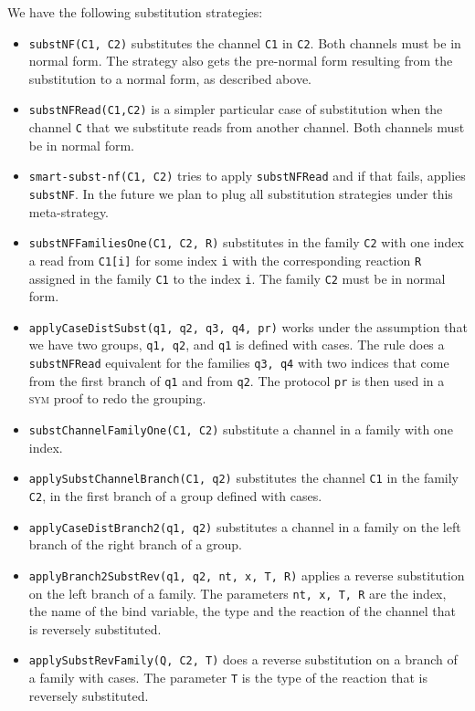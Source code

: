 We have the following substitution strategies:
\begin{itemize}
 \item  \texttt{substNF(C1, C2)} substitutes the channel \texttt{C1} in \texttt{C2}. Both channels must be in normal form. The strategy also gets the pre-normal form resulting from the substitution to a normal form, as described above.
   \item  \texttt{substNFRead(C1,C2)} is a simpler particular case of substitution when the channel \texttt{C} that we substitute reads from another channel. Both channels must be in normal form.
   \item  \texttt{smart-subst-nf(C1, C2)} tries to apply \texttt{substNFRead} and if that fails, applies \texttt{substNF}. 
In the future we plan to plug all substitution strategies under this
meta-strategy.
   \item  \texttt{substNFFamiliesOne(C1, C2, R)} substitutes in the family \texttt{C2} with one index a read from \texttt{C1[i]} for some index \texttt{i} with the corresponding reaction \texttt{R} assigned in the family \texttt{C1} to the index \texttt{i}. The family \texttt{C2} must be in normal form.
   \item  \texttt{applyCaseDistSubst(q1, q2, q3, q4, pr)} works under the assumption that we have two groups, \texttt{q1, q2}, and \texttt{q1} is defined with cases. The rule does a \texttt{substNFRead} equivalent for the families \texttt{q3, q4} with two indices that come from the first branch of \texttt{q1} and from \texttt{q2}. The protocol \texttt{pr} is then used in a \textsc{sym} proof to redo the grouping.
   \item  \texttt{substChannelFamilyOne(C1, C2)} substitute a channel in a family with one index.
   \item  \texttt{applySubstChannelBranch(C1, q2)} substitutes the channel 
   \texttt{C1} in the family \texttt{C2}, in the first branch of a group defined with cases.
   \item  \texttt{applyCaseDistBranch2(q1, q2)} substitutes a channel in a family on the left branch of the right branch of a group.
   \item  \texttt{applyBranch2SubstRev(q1, q2, nt, x, T, R)} applies a reverse substitution on the left branch of a family. The parameters \texttt{nt, x, T, R} are the index, the name of the bind variable, the type and the reaction of the channel that is reversely substituted. 
   \item  \texttt{applySubstRevFamily(Q, C2, T)} does a reverse substitution on a branch of a family with cases. The parameter \texttt{T} is the type of the reaction that is reversely substituted.

\end{itemize}
